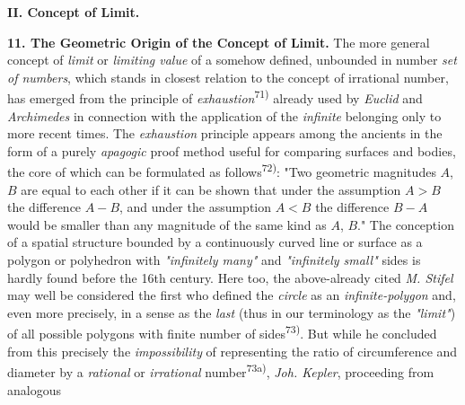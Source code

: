 \thispagestyle{fancy}

\vspace{0.5cm}

\begin{center}
    \textbf{II. Concept of Limit.}
\end{center}

\textbf{11. The Geometric Origin of the Concept of Limit.} The more general concept of \textit{limit} or \textit{limiting value} of a somehow defined, unbounded in number \textit{set of numbers}, which stands in closest relation to the concept of irrational number, has emerged from the principle of \textit{exhaustion}\textsuperscript{71)} already used by \textit{Euclid} and \textit{Archimedes} in connection with the application of the \textit{infinite} belonging only to more recent times. The \textit{exhaustion} principle appears among the ancients in the form of a purely \textit{apagogic} proof method useful for comparing surfaces and bodies, the core of which can be formulated as follows\textsuperscript{72)}: "Two geometric magnitudes $A$, $B$ are equal to each other if it can be shown that under the assumption $A > B$ the difference $A - B$, and under the assumption $A < B$ the difference $B - A$ would be smaller than any magnitude of the same kind as $A$, $B$." The conception of a spatial structure bounded by a continuously curved line or surface as a polygon or polyhedron with \textit{"infinitely many"} and \textit{"infinitely small"} sides is hardly found before the 16th century. Here too, the above-already cited \textit{M. Stifel} may well be considered the first who defined the \textit{circle} as an \textit{infinite-polygon} and, even more precisely, in a sense as the \textit{last} (thus in our terminology as the \textit{"limit"}) of all possible polygons with finite number of sides\textsuperscript{73)}. But while he concluded from this precisely the \textit{impossibility} of representing the ratio of circumference and diameter by a \textit{rational} or \textit{irrational} number\textsuperscript{73a)}, \textit{Joh. Kepler}, proceeding from analogous

